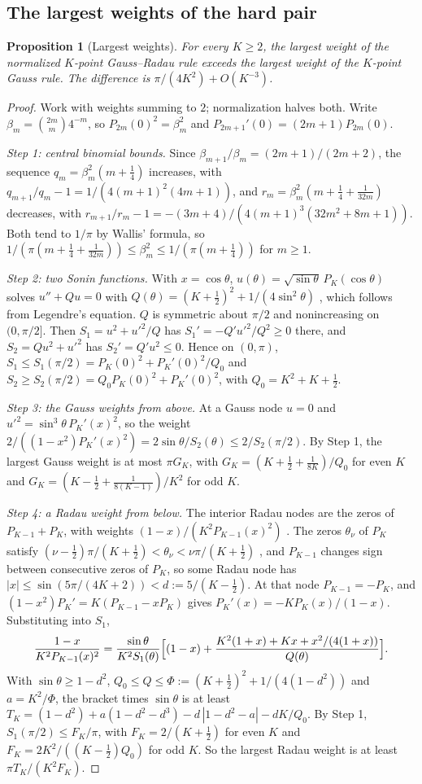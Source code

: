 \documentclass[12pt]{article}
\newtheorem{proposition}[theorem]{Proposition}
\theoremstyle{definition}
\theoremstyle{remark}
\begin{document}
\subsection{The largest weights of the hard pair}

\begin{proposition}[Largest weights]\label{prop:maxweight}
For every $K\ge2$, the largest weight of the normalized $K$-point Gauss--Radau rule exceeds the largest weight of the $K$-point Gauss rule. The difference is $\pi/(4K^2)+O(K^{-3})$.
\end{proposition}

\begin{proof}
Work with weights summing to $2$; normalization halves both. Write $\beta_m=\binom{2m}m4^{-m}$, so $P_{2m}(0)^2=\beta_m^2$ and $P_{2m+1}'(0)=(2m+1)P_{2m}(0)$.

\emph{Step 1: central binomial bounds.} Since $\beta_{m+1}/\beta_m=(2m+1)/(2m+2)$, the sequence $q_m=\beta_m^2(m+\frac14)$ increases, with $q_{m+1}/q_m-1=1/(4(m+1)^2(4m+1))$, and $r_m=\beta_m^2(m+\frac14+\frac1{32m})$ decreases, with $r_{m+1}/r_m-1=-(3m+4)/(4(m+1)^3(32m^2+8m+1))$. Both tend to $1/\pi$ by Wallis' formula, so $1/(\pi(m+\frac14+\frac1{32m}))\le\beta_m^2\le1/(\pi(m+\frac14))$ for $m\ge1$.

\emph{Step 2: two Sonin functions.} With $x=\cos\theta$, $u(\theta)=\sqrt{\sin\theta}\,P_K(\cos\theta)$ solves $u''+Q u=0$ with $Q(\theta)=(K+\frac12)^2+1/(4\sin^2\theta)$ \citep{szego1975}, which follows from Legendre's equation. $Q$ is symmetric about $\pi/2$ and nonincreasing on $(0,\pi/2]$. Then $S_1=u^2+u'^2/Q$ has $S_1'=-Q'u'^2/Q^2\ge0$ there, and $S_2=Qu^2+u'^2$ has $S_2'=Q'u^2\le0$. Hence on $(0,\pi)$, $S_1\le S_1(\pi/2)=P_K(0)^2+P_K'(0)^2/Q_0$ and $S_2\ge S_2(\pi/2)=Q_0P_K(0)^2+P_K'(0)^2$, with $Q_0=K^2+K+\frac12$.

\emph{Step 3: the Gauss weights from above.} At a Gauss node $u=0$ and $u'^2=\sin^3\theta\,P_K'(x)^2$, so the weight $2/((1-x^2)P_K'(x)^2)=2\sin\theta/S_2(\theta)\le2/S_2(\pi/2)$. By Step 1, the largest Gauss weight is at most $\pi G_K$, with $G_K=(K+\frac12+\frac1{8K})/Q_0$ for even $K$ and $G_K=(K-\frac12+\frac1{8(K-1)})/K^2$ for odd $K$.

\emph{Step 4: a Radau weight from below.} The interior Radau nodes are the zeros of $P_{K-1}+P_K$, with weights $(1-x)/(K^2P_{K-1}(x)^2)$ \citep[25.4.31]{abramowitz1964}. The zeros $\theta_\nu$ of $P_K$ satisfy $(\nu-\frac12)\pi/(K+\frac12)<\theta_\nu<\nu\pi/(K+\frac12)$ \citep[Theorem~6.21.2]{szego1975}, and $P_{K-1}$ changes sign between consecutive zeros of $P_K$, so some Radau node has $|x|\le\sin(5\pi/(4K+2))<d:=5/(K-\frac12)$. At that node $P_{K-1}=-P_K$, and $(1-x^2)P_K'=K(P_{K-1}-xP_K)$ gives $P_K'(x)=-KP_K(x)/(1-x)$. Substituting into $S_1$,
\[
\frac{1-x}{K^2P_{K-1}(x)^2}=\frac{\sin\theta}{K^2S_1(\theta)}\Bigl[(1-x)+\frac{K^2(1+x)+Kx+x^2/(4(1+x))}{Q(\theta)}\Bigr].
\]
With $\sin\theta\ge1-d^2$, $Q_0\le Q\le\Phi:=(K+\frac12)^2+1/(4(1-d^2))$ and $a=K^2/\Phi$, the bracket times $\sin\theta$ is at least $T_K=(1-d^2)+a(1-d^2-d^3)-d\,|1-d^2-a|-dK/Q_0$. By Step 1, $S_1(\pi/2)\le F_K/\pi$, with $F_K=2/(K+\frac12)$ for even $K$ and $F_K=2K^2/((K-\frac12)Q_0)$ for odd $K$. So the largest Radau weight is at least $\pi T_K/(K^2F_K)$.


\end{proof}
\end{document}
